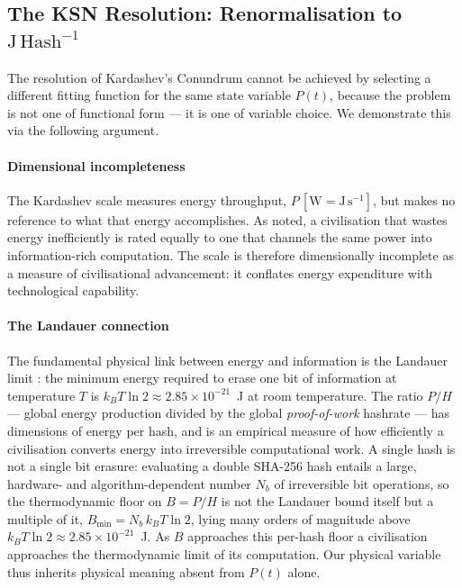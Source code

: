 \subsection{The KSN Resolution: Renormalisation to $\mathrm{J\,Hash^{-1}}$}
\label{sec:ksn}

The resolution of Kardashev's Conundrum cannot be achieved by selecting a different
fitting function for the same state variable $P(t)$, because the problem is not one of
functional form --- it is one of variable choice. We demonstrate this via the following
argument.

\paragraph{Dimensional incompleteness} The Kardashev scale measures energy throughput,
$P\,[\mathrm{W}=\mathrm{J\,s^{-1}}]$, but makes no reference to what that energy
accomplishes. As \citet{Sagan1973} noted, a civilisation that wastes energy inefficiently
is rated equally to one that channels the same power into information-rich computation.
The scale is therefore dimensionally incomplete as a measure of civilisational
advancement: it conflates energy expenditure with technological capability.

\paragraph{The Landauer connection} The fundamental physical link between energy and
information is the Landauer limit \citep{Landauer1961,Bennett1982}: the minimum energy
required to erase one bit of information at temperature $T$ is
$k_B T \ln 2 \approx 2.85\times10^{-21}$~J at room temperature. The ratio $P/H$ --- global energy production divided by the global \emph{proof-of-work}
hashrate --- has dimensions of energy per hash, and is an empirical measure of how
efficiently a civilisation converts energy into irreversible computational work. A single
hash is not a single bit erasure: evaluating a double SHA-256 hash entails a large,
hardware- and algorithm-dependent number $N_b$ of irreversible bit operations, so the
thermodynamic floor on $B=P/H$ is not the Landauer bound itself but a multiple of it,
$B_{\min}=N_b\,k_B T\ln 2$, lying many orders of magnitude above
$k_B T\ln 2\approx2.85\times10^{-21}$~J. As $B$ approaches this per-hash floor a
civilisation approaches the thermodynamic limit of its computation. Our physical variable
thus inherits physical meaning absent from $P(t)$ alone.

